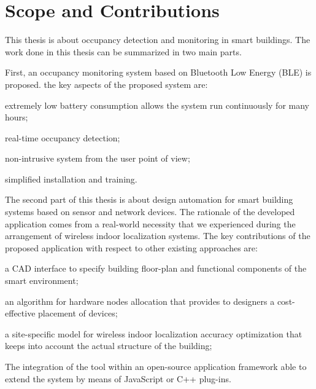 \section{Scope and Contributions}
This thesis is about occupancy detection and monitoring in smart buildings.
The work done in this thesis can be summarized in two main parts.

\medskip
First, an occupancy monitoring system based on Bluetooth Low Energy (BLE) is proposed. the key aspects of the proposed system are:
\begin{enumerate*}[label={\textbf{(\arabic*)}}]
\item extremely low battery consumption allows the system run continuously for many hours;
\item real-time occupancy detection;
\item non-intrusive system from the user point of view;
\item simplified installation and training.
\end{enumerate*}

\medskip
The second part of this thesis is about design automation for smart building systems based on sensor and network devices. The rationale of the developed application comes from a real-world necessity that we experienced during the arrangement of wireless indoor localization systems. The key contributions of the proposed application with respect to other existing approaches are:
\begin{enumerate*}[label={\textbf{(\arabic*)}}]
\item a CAD interface to specify building floor-plan and functional components of the smart environment;
\item an algorithm for hardware nodes allocation that provides to designers a cost-effective placement of devices;
\item a site-specific model for wireless indoor localization accuracy optimization that keeps into account the actual structure of the building;
\item The integration of the tool within an \mbox{open-source} application framework able to extend the system by means of JavaScript or C++ plug-ins.
\end{enumerate*}


